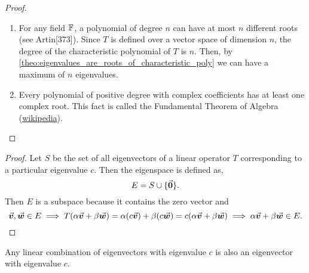 \documentclass[../MathsNotesBase.tex]{subfiles}
\begin{document}
{	 	\bigskip
	 	\begin{proof}\nl
	 		\begin{enumerate}[label=(\roman*)]
	 			\item{For any field $\mathbb{F}^{}$, a polynomial of degree $n$ can have at most $n$ different roots (see Artin[373]). Since $T$ is defined over a vector space of dimension $n$, the degree of the characteristic polynomial of $T$ is $n$. Then, by \autoref{theo:eigenvalues_are_roots_of_characteristic_poly} we can have a maximum of $n$ eigenvalues.}
	 			\item{Every polynomial of positive degree with complex coefficients has at least one complex root. This fact is called the Fundamental Theorem of Algebra (\href{https://en.wikipedia.org/wiki/Fundamental_theorem_of_algebra}{wikipedia}).}
	 		\end{enumerate}
	 	\end{proof}
	 
	 	\bigskip
	 	\begin{proof}
	 		Let $S$ be the set of all eigenvectors of a linear operator $T$ corresponding to a particular eigenvalue $c$. Then the eigenspace is defined as,
	 		\[ E = S \cup \{\vec{\bm{0}}\}. \]
	 		Then $E$ is a subspace because it contains the zero vector and
	 		\[ \vec{\bm{v}},\vec{\bm{w}} \in E \implies T(\alpha\vec{\bm{v}} + \beta\vec{\bm{w}}) = \alpha(c\vec{\bm{v}}) + \beta(c\vec{\bm{w}}) = c(\alpha\vec{\bm{v}} + \beta\vec{\bm{w}}) \implies \alpha\vec{\bm{v}} + \beta\vec{\bm{w}} \in E. \qedhere \]
	 	\end{proof}
 		\begin{corollary}
 			Any linear combination of eigenvectors with eigenvalue $c$ is also an eigenvector with eigenvalue $c$.
 		\end{corollary}
 	

}
\end{document}
